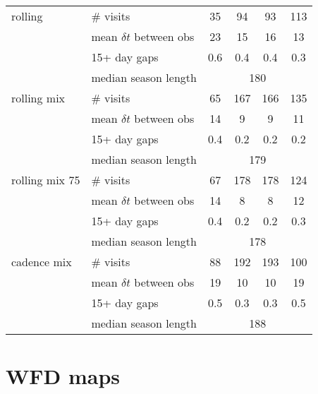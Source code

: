 \begin{appendices}
\begin{longtable}{l|l|cccc}
rolling          & \# visits                   &  35  &  94  &  93  & 113  \\
                 & mean $\delta t$ between obs &  23  &  15  &  16  &  13  \\
                 & 15+ day gaps                & 0.6  & 0.4  & 0.4  & 0.3  \\
                 & median season length               & \multicolumn{4}{c}{180}   \\
  \hline
  
rolling mix      & \# visits                   &  65  & 167  & 166  & 135  \\
                 & mean $\delta t$ between obs &  14  &   9  &   9  &  11  \\
                 & 15+ day gaps                & 0.4  & 0.2  & 0.2  & 0.2  \\
                 & median season length               & \multicolumn{4}{c}{179}   \\
  \hline

rolling mix 75   & \# visits                   &  67  & 178  & 178  & 124  \\
                 & mean $\delta t$ between obs &  14  &   8  &   8  &  12  \\
                 & 15+ day gaps                & 0.4  & 0.2  & 0.2  & 0.3  \\
                 & median season length               & \multicolumn{4}{c}{178}   \\
  \hline
  

 cadence mix     & \# visits                   &  88  & 192  & 193  & 100  \\
                 & mean $\delta t$ between obs &  19  &  10  &  10  &  19  \\
                 & 15+ day gaps                & 0.5  & 0.3  & 0.3  & 0.5  \\
                 & median season length               & \multicolumn{4}{c}{188}   \\
  \hline


      
\end{longtable}

\section{WFD maps}
\label{sec:wfd_maps}
  

\end{appendices}
